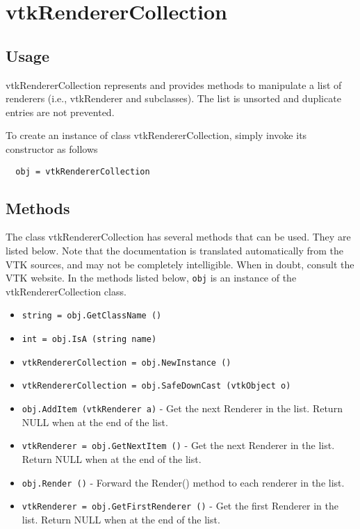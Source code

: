 \section{vtkRendererCollection}

\subsection{Usage}

 vtkRendererCollection represents and provides methods to manipulate a list 
 of renderers (i.e., vtkRenderer and subclasses). The list is unsorted and 
 duplicate entries are not prevented.

To create an instance of class vtkRendererCollection, simply
invoke its constructor as follows
\begin{verbatim}
  obj = vtkRendererCollection
\end{verbatim}
\subsection{Methods}

The class vtkRendererCollection has several methods that can be used.
  They are listed below.
Note that the documentation is translated automatically from the VTK sources,
and may not be completely intelligible.  When in doubt, consult the VTK website.
In the methods listed below, \verb|obj| is an instance of the vtkRendererCollection class.
\begin{itemize}
\item  \verb|string = obj.GetClassName ()|

\item  \verb|int = obj.IsA (string name)|

\item  \verb|vtkRendererCollection = obj.NewInstance ()|

\item  \verb|vtkRendererCollection = obj.SafeDownCast (vtkObject o)|

\item  \verb|obj.AddItem (vtkRenderer a)| -  Get the next Renderer in the list. Return NULL when at the end of the 
 list.

\item  \verb|vtkRenderer = obj.GetNextItem ()| -  Get the next Renderer in the list. Return NULL when at the end of the 
 list.

\item  \verb|obj.Render ()| -  Forward the Render() method to each renderer in the list.

\item  \verb|vtkRenderer = obj.GetFirstRenderer ()| -  Get the first Renderer in the list. Return NULL when at the end of the 
 list.

\end{itemize}

